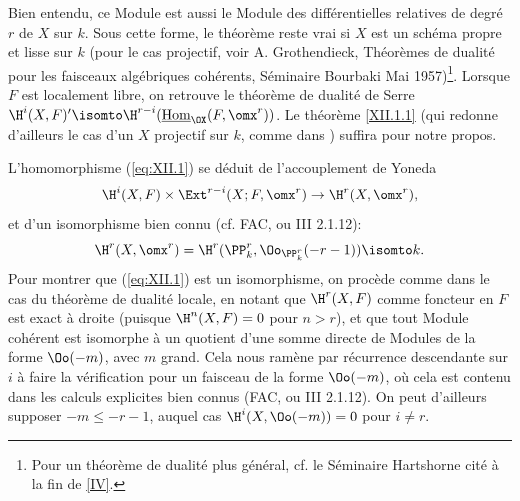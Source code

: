 \begin{remarquestar}
Bien entendu, ce Module est aussi le Module des diff\'erentielles relatives de degr\'e $r$ de $X$ sur $k$. Sous cette forme, le th\'eor\`eme reste vrai si $X$ est un sch\'ema propre et lisse sur $k$ (pour le cas projectif, voir A. Grothendieck, \og Th\'eor\`emes de dualit\'e pour les faisceaux alg\'ebriques coh\'erents\fg, S\'eminaire Bourbaki Mai 1957)\footnote{Pour un th\'eor\`eme de dualit\'e plus g\'en\'eral, cf. le S\'eminaire Hartshorne cit\'e \`a la fin de \Exp \ref{IV}.}. Lorsque $F$ est localement libre, on retrouve le th\'eor\`eme de dualit\'e de Serre $\H^i(X, F)' \isomto \H^{r-i}(\mathop{\underline{\mathrm{Hom}}}\nolimits_{\OX}(F, \omx^r))$. Le th\'eor\`eme \ref{XII.1.1} (qui redonne d'ailleurs le cas d'un $X$ projectif sur $k$, comme dans {\loccit}) suffira pour notre propos.
\end{remarquestar} L'homomorphisme (\ref{eq:XII.1}) se d\'eduit de l'accouplement de Yoneda
\steco
\begin{equation} \label{eq:XII.3} {}\H^i(X, F) \times \Ext^{r-i}(X;F, \omx^r) \to \H^r(X, \omx^r),
\end{equation}
et d'un isomorphisme bien connu (cf. FAC, ou \EGA III 2.1.12):
\steco
\begin{equation} \label{eq:XII.4} {}\H^r(X, \omx^r) = \H^r(\PP_k^r, \Oo_{\PP_k^r}(-r-1)) \isomto k.
\end{equation}
Pour montrer que (\ref{eq:XII.1}) est un isomorphisme, on proc\`ede comme dans le cas du th\'eor\`eme de dualit\'e locale, en notant que $\H^r(X, F)$ comme foncteur en $F$ est exact \`a droite (puisque $\H^n(X, F)=0$ pour $n>r$), et que tout Module coh\'erent est isomorphe \`a un quotient d'une somme directe de Modules de la forme $\Oo(-m)$, avec $m$ grand. Cela nous ram\`ene par r\'ecurrence descendante sur $i$ \`a faire la v\'erification pour un faisceau de la forme $\Oo(-m)$, o\`u cela est contenu dans les calculs explicites bien connus (FAC, ou \EGA III 2.1.12). On peut d'ailleurs supposer $-m \leq -r-1$, auquel cas $\H^i(X, \Oo(-m))=0$ pour $i\neq r$.

